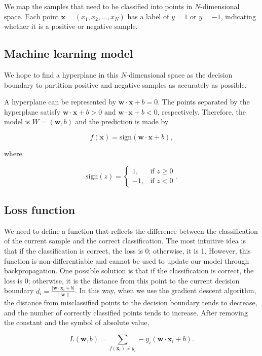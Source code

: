 \documentclass[12pt]{article}
\begin{document}
We map the samples that need to be classified into points in $N$-dimensional space. Each point $\mathbf{x}=(x_1,x_2,...,x_N)$ has a label of $y=1$ or $y=-1$, indicating whether it is a positive or negative sample.

\subsection{Machine learning model}
    
We hope to find a hyperplane in this $N$-dimensional space as the decision boundary to partition positive and negative samples as accurately as possible. 

A hyperplane can be represented by $\mathbf{w}\cdot\mathbf{x}+b=0$. The points separated by the hyperplane satisfy $\mathbf{w}\cdot\mathbf{x}+b>0$ and $\mathbf{w}\cdot\mathbf{x}+b<0$, respectively. Therefore, the model is $W=(\mathbf{w},b)$ and the prediction is made by

$$
f(\mathbf{x})=\text{sign}(\mathbf{w}\cdot\mathbf{x}+b),
$$

where

$$
\text{sign}(z)=
\begin{cases}
1, & \text{if } z \geq 0 \\
-1, & \text{if } z < 0
\end{cases}.
$$

\subsection{Loss function}

We need to define a function that reflects the difference between the classification of the current sample and the correct classification. The most intuitive idea is that if the classification is correct, the loss is 0; otherwise, it is 1. However, this function is non-differentiable and cannot be used to update our model through backpropagation. One possible solution is that if the classification is correct, the loss is 0; otherwise, it is the distance from this point to the current decision boundary $d_i=\frac{|\mathbf{w}\cdot\mathbf{x}_i+b|}{\|\mathbf{w}\|}$. In this way, when we use the gradient descent algorithm, the distance from misclassified points to the decision boundary tends to decrease, and the number of correctly classified points tends to increase. After removing the constant and the symbol of 
absolute value,

$$
L(\mathbf{w},b)=\sum_{f(\mathbf{x}_i)\not=y_i}-y_i(\mathbf{w}\cdot\mathbf{x}_i+b).
$$
\end{document}
